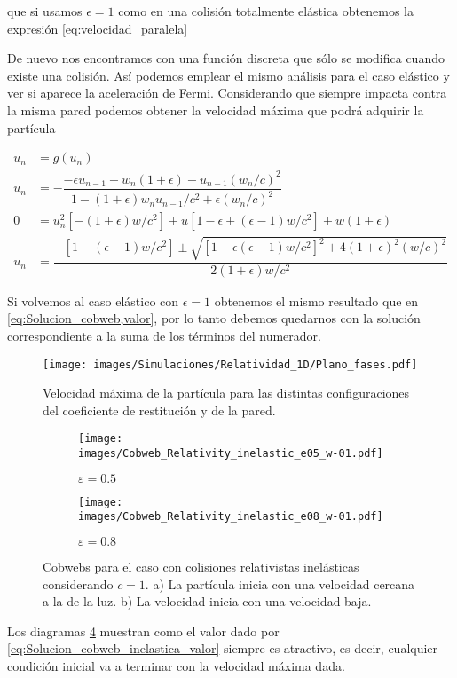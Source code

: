 que si usamos \( \epsilon = 1 \) como en una colisión totalmente elástica obtenemos la expresión \ref{eq:velocidad_paralela}

\vspace{3mm}

De nuevo nos encontramos con una función discreta que sólo se modifica cuando existe una colisión. Así podemos emplear el mismo análisis para el caso elástico y ver si aparece la aceleración de Fermi. Considerando que siempre impacta contra la misma pared podemos obtener la velocidad máxima que podrá adquirir la partícula

\begin{align}\label{eq:Solucion_cobweb_inelastica}
    u_n &= g(u_n) \nonumber\\
    u_n &= -\dfrac{-\epsilon u_{n-1} + w_n(1+\epsilon) -  u_{n-1}(w_n/c)^2}{1 - (1+\epsilon)w_n u_{n-1}/c^2 + \epsilon(w_n/c)^2} \\
    0 &= u_n^2\left[ -(1+\epsilon)w/c^2 \right] + u\left[ 1 - \epsilon + (\epsilon - 1)w/c^2 \right] + w(1+\epsilon) \nonumber\\
    u_n &= \dfrac{-\left[ 1 -  (\epsilon - 1)w/c^2 \right] \pm \sqrt{\left[ 1 - \epsilon (\epsilon - 1)w/c^2 \right]^2 + 4(1+\epsilon)^2(w/c)^2}}{2(1+\epsilon)w/c^2} \label{eq:Solucion_cobweb_inelastica_valor}
\end{align}

Si volvemos al caso elástico con \( \epsilon = 1 \) obtenemos el mismo resultado que en \ref{eq:Solucion_cobweb,valor}, por lo tanto debemos quedarnos con la solución correspondiente a la suma de los términos del numerador. 

\begin{figure}[H]
    \centering
    \texttt{[image: images/Simulaciones/Relatividad\_1D/Plano\_fases.pdf]}
    \caption{Velocidad máxima de la partícula para las distintas configuraciones del coeficiente de restitución y de la pared.}
    \label{fig:plano_fases_coef_wall}
\end{figure}

\begin{figure}[H]
    \centering
    \begin{subfigure}[b]{0.49\textwidth}
        \centering
        \texttt{[image: images/Cobweb\_Relativity\_inelastic\_e05\_w-01.pdf]}
        \caption{$\varepsilon = 0.5$}
        \label{fig:Cobweb_inelastics_A}
    \end{subfigure}
    \hfill
    \begin{subfigure}[b]{0.49\textwidth}
        \centering
        \texttt{[image: images/Cobweb\_Relativity\_inelastic\_e08\_w-01.pdf]}
        \caption{$\varepsilon = 0.8$}
        \label{fig:Cobweb_inelastics_B}
    \end{subfigure}
    \caption{Cobwebs para el caso con colisiones relativistas inelásticas considerando $c=1$. a) La partícula inicia con una velocidad cercana a la de la luz. b) La velocidad inicia con una velocidad baja. }
        \label{fig:Cobweb_inelastics}
\end{figure}

Los diagramas \ref{fig:Cobweb_inelastics} muestran como el valor dado por \ref{eq:Solucion_cobweb_inelastica_valor} siempre es atractivo, es decir, cualquier condición inicial va a terminar con la velocidad máxima dada.

%